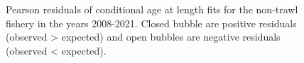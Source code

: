 \documentclass[
]{scrartcl}
\begin{document}
\begin{figure}[H]


\caption{\label{fig-peasrson-resids-age-nt1}Pearson residuals of
conditional age at length fits for the non-trawl fishery in the years
2008-2021. Closed bubble are positive residuals (observed \textgreater{}
expected) and open bubbles are negative residuals (observed \textless{}
expected).}

\end{figure}%
\end{document}
